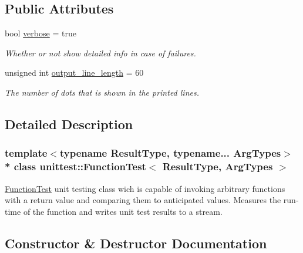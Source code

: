 \subsection*{Public Attributes}
\begin{DoxyCompactItemize}
\item 
bool \hyperlink{classunittest_1_1_function_test_a0eb2680ff0867ff55daffa2b09c90280}{verbose} = true\hypertarget{classunittest_1_1_function_test_a0eb2680ff0867ff55daffa2b09c90280}{}\label{classunittest_1_1_function_test_a0eb2680ff0867ff55daffa2b09c90280}

\begin{DoxyCompactList}\small\item\em Whether or not show detailed info in case of failures. \end{DoxyCompactList}\item 
unsigned int \hyperlink{classunittest_1_1_function_test_aa9959c19872e086b9401382cb381f552}{output\+\_\+line\+\_\+length} = 60\hypertarget{classunittest_1_1_function_test_aa9959c19872e086b9401382cb381f552}{}\label{classunittest_1_1_function_test_aa9959c19872e086b9401382cb381f552}

\begin{DoxyCompactList}\small\item\em The number of dots that is shown in the printed lines. \end{DoxyCompactList}\end{DoxyCompactItemize}


\subsection{Detailed Description}
\subsubsection*{template$<$typename Result\+Type, typename... Arg\+Types$>$\\*
class unittest\+::\+Function\+Test$<$ Result\+Type, Arg\+Types $>$}

\hyperlink{classunittest_1_1_function_test}{Function\+Test} unit testing class wich is capable of invoking arbitrary functions with a return value and comparing them to anticipated values. Measures the run-\/time of the function and writes unit test results to a stream. 

\subsection{Constructor \& Destructor Documentation}
